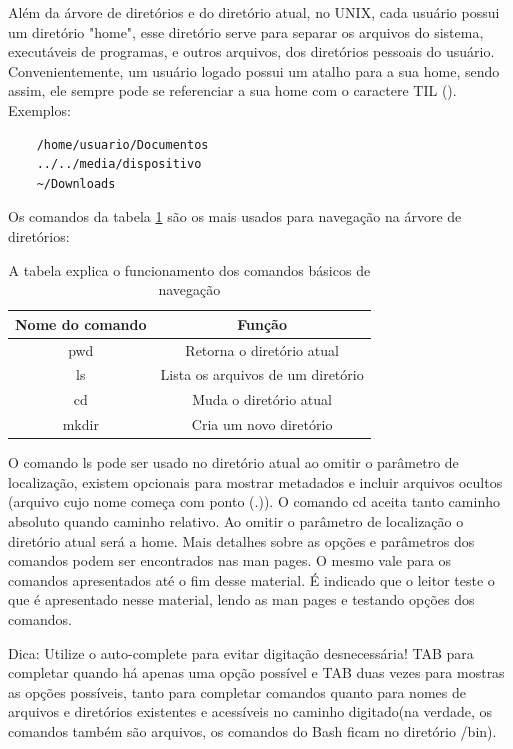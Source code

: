 \documentclass[oneside, 11 pt]{article}
\begin{document}
	Além da árvore de diretórios e do diretório atual, no UNIX, cada usuário possui um diretório "home", esse diretório serve para separar os arquivos do sistema, executáveis de programas, e outros arquivos, dos diretórios pessoais do usuário. Convenientemente, um usuário logado possui um atalho para a sua home, sendo assim, ele sempre pode se referenciar a sua home com o caractere TIL (\texttildelow).
	Exemplos: 
	\begin{lstlisting}
	/home/usuario/Documentos
	../../media/dispositivo
	~/Downloads
	\end{lstlisting}
	Os comandos da tabela \ref{table:1} são os mais usados para navegação na árvore de diretórios:
	
	\begin{table}[!ht]
		\centering
		\begin{tabular}{ | c | c | } 
			\hline
			\bfseries Nome do comando & \bfseries Função \\
			\hline
			pwd & Retorna o diretório atual \\
			\hline
			ls & Lista os arquivos de um diretório \\
			\hline
			cd & Muda o diretório atual \\
			\hline
			mkdir & Cria um novo diretório \\
			\hline
		\end{tabular}
		\caption{A tabela explica o funcionamento dos comandos básicos de navegação}
		\label{table:1}
	\end{table}
	O comando ls pode ser usado no diretório atual ao omitir o parâmetro de localização, existem opcionais para mostrar metadados e incluir arquivos ocultos (arquivo cujo nome começa com ponto (.)). O comando cd aceita tanto caminho absoluto quando caminho relativo. Ao omitir o parâmetro de localização o diretório atual será a home. Mais detalhes sobre as opções e parâmetros dos comandos podem ser encontrados nas man pages. O mesmo vale para os comandos apresentados até o fim desse material. É indicado que o leitor teste o que é apresentado nesse material, lendo as man pages e testando opções dos comandos.
	
	Dica: Utilize o auto-complete para evitar digitação desnecessária! TAB para completar quando há apenas uma opção possível e TAB duas vezes para mostras as opções possíveis, tanto para completar comandos quanto para nomes de arquivos e diretórios existentes e acessíveis no caminho digitado(na verdade, os comandos também são arquivos, os comandos do Bash ficam no diretório /bin).
	
\end{document}
